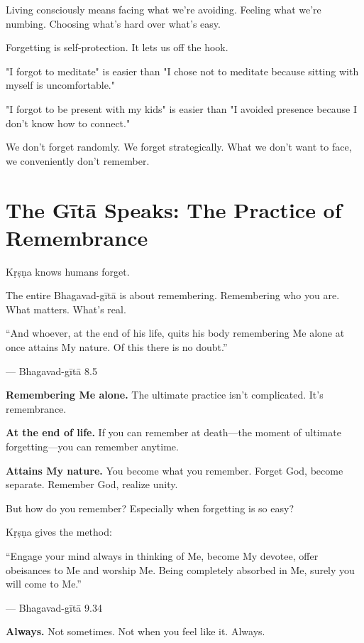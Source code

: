 \documentclass[11pt,twoside]{book}
\begin{document}
Living consciously means facing what we're avoiding. Feeling what we're numbing. Choosing what's hard over what's easy.

Forgetting is self-protection. It lets us off the hook.

"I forgot to meditate" is easier than "I chose not to meditate because sitting with myself is uncomfortable."

"I forgot to be present with my kids" is easier than "I avoided presence because I don't know how to connect."

We don't forget randomly. We forget strategically. What we don't want to face, we conveniently don't remember.

\section*{The Gītā Speaks: The Practice of Remembrance}

Kṛṣṇa knows humans forget.

The entire Bhagavad-gītā is about remembering. Remembering who you are. What matters. What's real.

\begin{pullquote}
``And whoever, at the end of his life, quits his body remembering Me alone at once attains My nature. Of this there is no doubt.''

--- Bhagavad-gītā 8.5
\end{pullquote}

\textbf{\textbf{Remembering Me alone.}} The ultimate practice isn't complicated. It's remembrance.

\textbf{\textbf{At the end of life.}} If you can remember at death—the moment of ultimate forgetting—you can remember anytime.

\textbf{\textbf{Attains My nature.}} You become what you remember. Forget God, become separate. Remember God, realize unity.

But how do you remember? Especially when forgetting is so easy?

Kṛṣṇa gives the method:

\begin{pullquote}
``Engage your mind always in thinking of Me, become My devotee, offer obeisances to Me and worship Me. Being completely absorbed in Me, surely you will come to Me.''

--- Bhagavad-gītā 9.34
\end{pullquote}

\textbf{\textbf{Always.}} Not sometimes. Not when you feel like it. Always.
\end{document}
